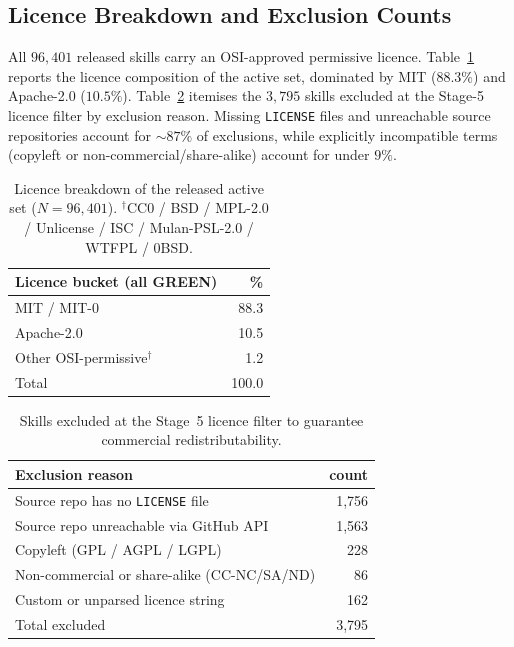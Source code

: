 \subsection{Licence Breakdown and Exclusion Counts}
\label{app:licence}

All $96{,}401$ released skills carry an OSI-approved permissive
licence.  Table~\ref{tab:license} reports the licence composition
of the active set, dominated by MIT ($88.3\%$) and Apache-2.0
($10.5\%$).  Table~\ref{tab:license-filter} itemises the
$3{,}795$ skills excluded at the Stage-5 licence filter by
exclusion reason.  Missing \texttt{LICENSE} files and unreachable
source repositories account for $\sim$$87\%$ of exclusions,
while explicitly incompatible terms (copyleft or
non-commercial/share-alike) account for under $9\%$.

\begin{table}[!ht]
\centering\small
\setlength{\tabcolsep}{3pt}
\begin{tabular}{@{}lr@{}}
\toprule
Licence bucket (all GREEN)                    & \%    \\
\midrule
MIT / MIT-0                                   & 88.3  \\
Apache-2.0                                    & 10.5  \\
Other OSI-permissive$^{\dagger}$              &  1.2  \\
\midrule
Total                                         & 100.0 \\
\bottomrule
\end{tabular}
\caption{Licence breakdown of the released active set
($N{=}96{,}401$).  $^{\dagger}$CC0 / BSD / MPL-2.0 / Unlicense /
ISC / Mulan-PSL-2.0 / WTFPL / 0BSD.}
\label{tab:license}
\end{table}

\begin{table}[!ht]
\centering\small
\setlength{\tabcolsep}{3pt}
\begin{tabular}{@{}lr@{}}
\toprule
Exclusion reason                              & count   \\
\midrule
Source repo has no \texttt{LICENSE} file      & 1{,}756 \\
Source repo unreachable via GitHub API        & 1{,}563 \\
Copyleft (GPL / AGPL / LGPL)                  &   228   \\
Non-commercial or share-alike (CC-NC/SA/ND)   &    86   \\
Custom or unparsed licence string             &   162   \\
\midrule
Total excluded                                & 3{,}795 \\
\bottomrule
\end{tabular}
\caption{Skills excluded at the Stage~5 licence filter to
guarantee commercial redistributability.}
\label{tab:license-filter}
\end{table}


